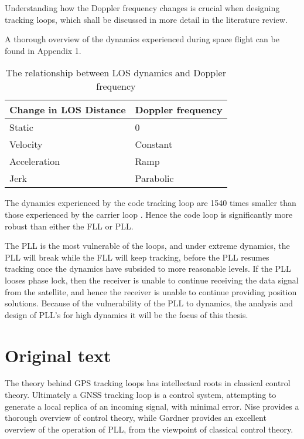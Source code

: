 Understanding how the Doppler frequency changes is crucial when designing tracking loops, which shall be discussed in more detail in the literature review. 

A thorough overview of the dynamics experienced during space flight can be found in Appendix 1.
\begin{table}[!htb]
\centering
\begin{tabular}{|l|l|}
\hline
\rowcolor[HTML]{C0C0C0} 
Change in \ac{LOS} Distance & Doppler frequency \\ \hline
Static                 & 0                 \\ \hline
\rowcolor[HTML]{EFEFEF} 
Velocity               & Constant          \\ \hline
Acceleration           & Ramp              \\ \hline
\rowcolor[HTML]{EFEFEF} 
Jerk                   & Parabolic         \\ \hline
\end{tabular}
\caption{The relationship between \ac{LOS} dynamics and Doppler frequency}
\label{table:DopplerDynamics}
\end{table}


The dynamics experienced by the code tracking loop are 1540 times smaller than those experienced by the carrier loop \cite{Kaplan}. Hence the  code loop is significantly more robust than either the \ac{FLL} or \ac{PLL}.

The \ac{PLL} is the most vulnerable of the loops, and under extreme dynamics, the \ac{PLL} will break while the \ac{FLL} will keep tracking, before the \ac{PLL} resumes tracking once the dynamics have subsided to more reasonable levels. If the \ac{PLL} looses phase lock, then the receiver is unable to continue receiving the data signal from the satellite, and hence the receiver is unable to continue providing position solutions. Because of the vulnerability of the \ac{PLL} to dynamics, the analysis and design of \ac{PLL}'s for high dynamics it will be the focus of this thesis. 

\section{Original text}
The theory behind GPS tracking loops has intellectual roots in classical control theory. Ultimately a \ac{GNSS} tracking loop is a control system, attempting to generate a local replica of an incoming signal, with minimal error. Nise \cite{Nise} provides a thorough overview of control theory, while Gardner \cite{Gardner} provides an excellent overview of the operation of PLL, from the viewpoint of classical control theory.  

